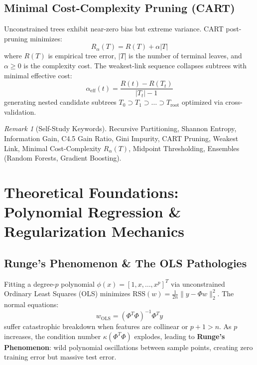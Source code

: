 \documentclass[11pt,a4paper]{article}
\theoremstyle{definition}
\theoremstyle{plain}
\theoremstyle{remark}
\newtheorem*{remark}{Remark}
\begin{document}
\subsection{Minimal Cost-Complexity Pruning (CART)}
Unconstrained trees exhibit near-zero bias but extreme variance. CART post-pruning minimizes:
\begin{equation}
R_\alpha(T) = R(T) + \alpha |T|
\end{equation}
where $R(T)$ is empirical tree error, $|T|$ is the number of terminal leaves, and $\alpha \ge 0$ is the complexity cost. The weakest-link sequence collapses subtrees with minimal effective cost:
\begin{equation}
\alpha_{\mathrm{eff}}(t) = \frac{R(t) - R(T_t)}{|T_t| - 1}
\end{equation}
generating nested candidate subtrees $T_0 \supset T_1 \supset \dots \supset T_{\mathrm{root}}$ optimized via cross-validation.

\begin{remark}[Self-Study Keywords]
Recursive Partitioning, Shannon Entropy, Information Gain, C4.5 Gain Ratio, Gini Impurity, CART Pruning, Weakest Link, Minimal Cost-Complexity $R_\alpha(T)$, Midpoint Thresholding, Ensembles (Random Forests, Gradient Boosting).
\end{remark}

\section[Polynomial Regression and Regularization Mechanics]{Theoretical Foundations: Polynomial Regression \& Regularization Mechanics}

\subsection{Runge's Phenomenon \& The OLS Pathologies}
Fitting a degree-$p$ polynomial $\phi(x) = [1, x, \dots, x^p]^T$ via unconstrained Ordinary Least Squares (OLS) minimizes $\text{RSS}(w) = \frac{1}{2n}\|y - \Phi w\|_2^2$. The normal equations:
\begin{equation}
w_{\mathrm{OLS}} = (\Phi^T \Phi)^{-1} \Phi^T y
\end{equation}
suffer catastrophic breakdown when features are collinear or $p+1 > n$. As $p$ increases, the condition number $\kappa(\Phi^T \Phi)$ explodes, leading to \textbf{Runge's Phenomenon}: wild polynomial oscillations between sample points, creating zero training error but massive test error.
\end{document}
